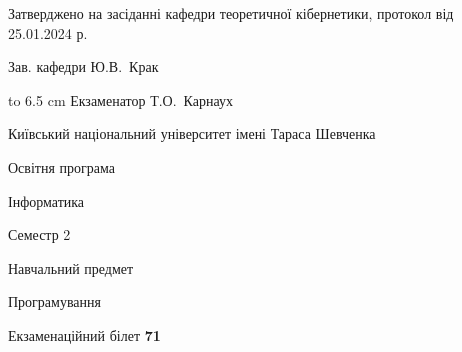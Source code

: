 \documentclass[12pt, ukrainian]{article}
\begin{document}
{\smallskip\smallskip \begin {scriptsize} Затверджено на засіданні кафедри теоретичної кібернетики, протокол   від   25.01.2024 р.\par\smallskip\smallskip\smallskip\smallskip
{\parbox {6.5 cm} {Зав. кафедри \dotfill Ю.В.~Крак}}\hspace {0.7cm} {\hbox to 6.5 cm { Екзаменатор \dotfill Т.О.~Карнаух}} \end{scriptsize}}
\newpage
{{\begin {scriptsize}\par
{ \center  Київський національний університет імені Тараса Шевченка \par}
{\parbox {5 cm}{Освітня програма \hfill}{\parbox {7 cm}{Інформатика\hfill}}\parbox {6 cm}{\hfill Семестр 2}}\par
{\parbox {5 cm} {Навчальний предмет \hfill}\parbox {7 cm}{Програмування \hfill}\parbox {6cm}{\hfill}\par}\vspace{-15pt} \end{scriptsize}}{\center Екзаменаційний білет \No \textbf { 71 }\par}}
\end{document}
